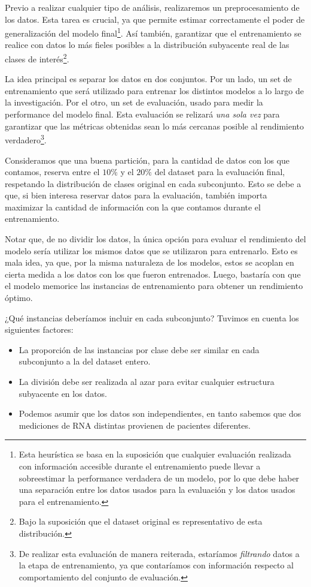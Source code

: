 Previo a realizar cualquier tipo de análisis, realizaremos un preprocesamiento de los datos. Esta tarea es crucial, ya que  permite estimar correctamente el poder de generalización del modelo final\footnote{Esta heurística se basa en la suposición que cualquier evaluación realizada con información accesible durante el entrenamiento puede llevar a sobreestimar la performance verdadera de un modelo, por lo que debe haber una separación entre los datos usados para la evaluación y los datos usados para el entrenamiento.}. Así también, garantizar que el entrenamiento se realice con datos lo más fieles posibles a la distribución subyacente real de las clases de interés\footnote{Bajo la suposición que el dataset original es representativo de esta distribución.}. 

La idea principal es separar los datos en dos conjuntos. Por un lado, un set de entrenamiento que será utilizado para entrenar los distintos modelos a lo largo de la investigación. Por el otro, un set de evaluación, usado para medir la performance del modelo final. Esta evaluación se relizará \textit{una sola vez} para garantizar que las métricas obtenidas sean lo más cercanas posible al rendimiento verdadero\footnote{De realizar esta evaluación de manera reiterada, estaríamos \textit{filtrando} datos a la etapa de entrenamiento, ya que contaríamos con información respecto al comportamiento del conjunto de evaluación.}.

Consideramos que una buena partición, para la cantidad de datos con los que contamos, reserva entre el $10\%$ y el $20\%$ del dataset para la evaluación final, respetando la distribución de clases original en cada subconjunto. Esto se debe a que, si bien interesa reservar datos para la evaluación, también importa maximizar la cantidad de información con la que contamos durante el entrenamiento.

Notar que, de no dividir los datos, la única opción para evaluar el rendimiento del modelo sería utilizar los mismos datos que se utilizaron para entrenarlo. Esto es mala idea, ya que, por la misma naturaleza de los modelos, estos se acoplan en cierta medida a los datos con los que fueron entrenados. Luego, bastaría con que el modelo memorice las instancias de entrenamiento para obtener un rendimiento óptimo.

¿Qué instancias deberíamos incluir en cada subconjunto? Tuvimos en cuenta los siguientes factores:

\begin{itemize}
    \item La proporción de las instancias por clase debe ser similar en cada subconjunto a la del dataset entero.
    \item La división debe ser realizada al azar para evitar cualquier estructura subyacente en los datos.
    \item Podemos asumir que los datos son independientes, en tanto sabemos que dos mediciones de RNA distintas provienen de pacientes diferentes. 
\end{itemize}


